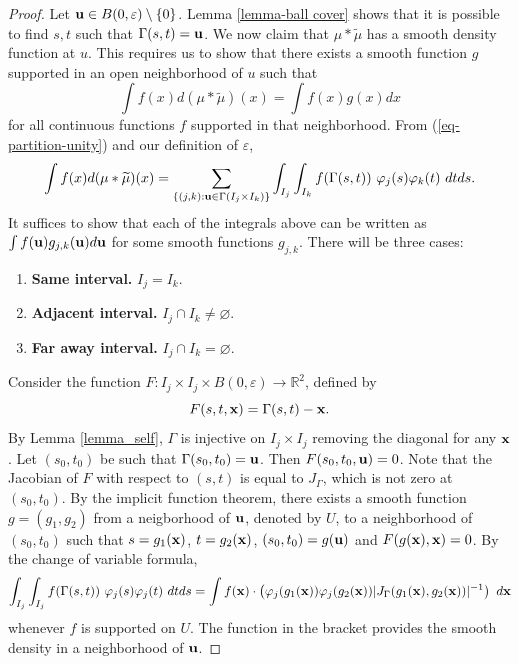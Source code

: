 \documentclass[12pt,a4paper,oneside]{amsart}
\theoremstyle{definition}
\newcommand{\RR}{{\mathbb R}}
\newcommand{\wt}[1]{\widetilde{#1}}
\newcounter{rem}
\begin{document}
\begin{proof}
Let  ${\bf u}\in B(0,\varepsilon)\setminus \{0\}$. Lemma \ref{lemma-ball cover} shows that it is possible to find $s,t$ such that $\Gamma (s,t) = {\bf u}$. We now claim that $\mu\ast\wt{\mu}$ has a smooth density function at $u$. This requires us to show that there exists a smooth function $g$ supported in an open neighborhood of $u$ such that 
$$
\int f(x) d(\mu\ast\wt\mu)(x) = \int f(x) g(x)dx
$$
for all continuous functions $f$ supported in that neighborhood.  From (\ref{eq-partition-unity}) and our definition of ${\varepsilon}$, 
\begin{equation}\label{eq-partition-unity1}
\int f(x)d(\mu\ast\wt{\mu})(x) = \sum_{\{(j,k): {\bf u}\in \Gamma(I_j\times I_k)\}}\int_{I_j}\int_{I_k} f(\Gamma(s,t))~\varphi_j(s)\varphi_k(t)~dtds.
\end{equation}
It suffices to show that each of the integrals above can be written as $
\int f({\bf u}) g_{{j,k}}({\bf u})d{\bf u}$ for some smooth functions $g_{{j,k}}$. There will be three cases:
\begin{enumerate}
    \item[Case 1:] {\bf  Same interval.} $I_j = I_k$.
    \item [Case 2:] {\bf  Adjacent interval.} $I_j \cap I_k\ne \varnothing$.
    \item[Case 3:]  {\bf Far away interval.} $I_j \cap I_k= \varnothing$.
\end{enumerate}

Consider the function {$F: I_j\times I_j\times B(0,\varepsilon)\to \RR^2$}, defined by 
\begin{equation}\label{eq_F}
F(s,t,{\bf x}) = \Gamma(s,t)- {\bf x}.
\end{equation}
By Lemma \ref{lemma_self}, $\Gamma$ is injective on $I_j\times I_j$ removing the diagonal {for any ${\bf x}$}. Let $(s_0,t_0)$ be such that $\Gamma(s_0,t_0) = {\bf u}$. Then $F(s_0,t_0,{\bf u}) =0$.  Note that the Jacobian of $F$ with respect to $(s,t)$ is equal to $J_{\Gamma}$, which is not zero at $(s_0,t_0).$ By the implicit function theorem, there exists a smooth function $g = (g_1,g_2)$ from a neigborhood of ${\bf u}$, denoted by $U$,  to a neighborhood of $(s_0,t_0)$ such that $s = g_1({\bf x})$, $t = g_2({\bf x})$, $(s_0,t_0) = g({\bf u})$ and $F(g({\bf x}),{\bf x}) = 0$. By the change of variable formula, 
\begin{equation}\label{eq-change-variable}
\int_{I_j}\int_{I_j} f(\Gamma(s,t))~\varphi_j(s)\varphi_j(t)~dtds= \int f({\bf x})\cdot \left(\varphi_j (g_1({\bf x}))\varphi_j (g_2({\bf x})) |J_{\Gamma}(g_1({\bf x}),g_2({\bf x}))|^{-1}\right) ~d{\bf x}
\end{equation}
whenever $f$ is supported on $U$. The function  in the bracket provides the smooth density in a neighborhood of ${\bf u}$. 



\end{proof}
\end{document}
